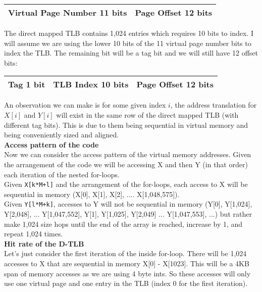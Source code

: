 \documentclass[a4paper, 11pt]{exam}
\begin{document}
\begin{enumerate}
\begin{center}
	\begin{tabular}{|c|c|}
		\hline
		Virtual Page Number 11 bits & Page Offset 12 bits\\
		\hline
	\end{tabular}
\end{center}

The direct mapped TLB contains 1,024 entries which requires 10 bits to index. I will assume we are using the lower 10 bits of the 11 virtual page number bits to index the TLB. The remaining bit will be a tag bit and we will still have 12 offset bits:

\begin{center}
	\begin{tabular}{|c|c|c|}
		\hline
		Tag 1 bit & TLB Index 10 bits & Page Offset 12 bits\\
		\hline
	\end{tabular}
\end{center}

An observation we can make is for some given index $i$, the address translation for $X[i]$ and $Y[i]$ will exist in the same row of the direct mapped TLB (with different tag bits). This is due to them being sequential in virtual memory and being conveniently sized and aligned. \\

\textbf{Access pattern of the code} \\

Now we can consider the access pattern of the virtual memory addresses. Given the arrangement of the code we will be accessing X and then Y (in that order) each iteration of the nested for-loops. \\

Given \texttt{X[k*M+l]} and the arrangement of the for-loops, each access to X will be sequential in memory (X[0], X[1], X[2], .... X[1,048,575]). \\

Given \texttt{Y[l*M+k]}, accesses to Y will not be sequential in memory (Y[0], Y[1,024], Y[2,048], ... Y[1,047,552], Y[1], Y[1,025], Y[2,049] ... Y[1,047,553], ...) but rather make 1,024 size hops until the end of the array is reached, increase by 1, and repeat 1,024 times. \\

\textbf{Hit rate of the D-TLB} \\

Let's just consider the first iteration of the inside for-loop. There will be 1,024 accesses to X that are sequential in memory X[0] - X[1023]. This will be a 4KB span of memory accesses as we are using 4 byte ints. So these accesses will only use one virtual page and one entry in the TLB (index 0 for the first iteration). \\


\end{enumerate}
\end{document}
